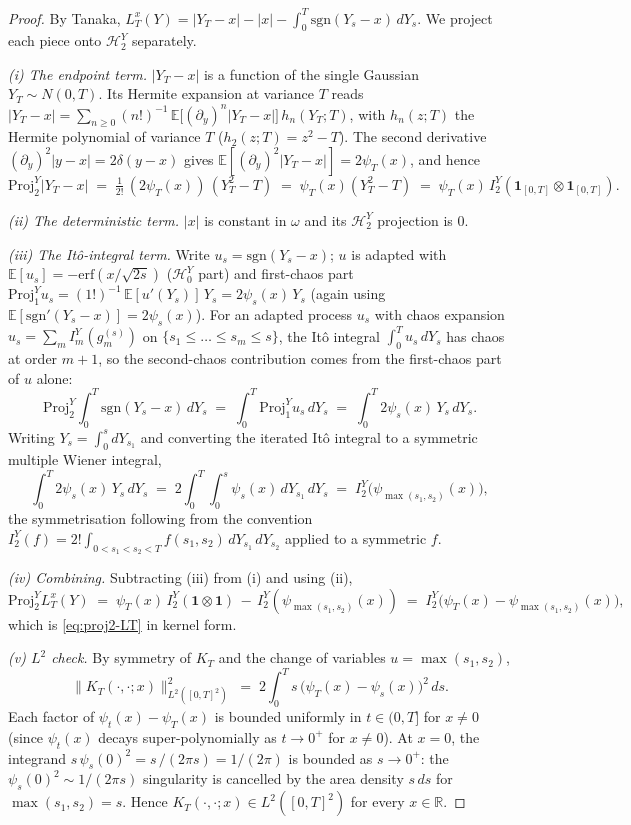 \documentclass[11pt,reqno]{amsart}
\theoremstyle{plain}
\theoremstyle{definition}
\theoremstyle{remark}
\newcommand{\R}{\mathbb{R}}
\newcommand{\E}{\mathbb{E}}
\newcommand{\Proj}{\mathrm{Proj}}
\newcommand{\HY}[1]{\mathcal{H}^{Y}_{#1}}
\newcommand{\Loc}{L}
\begin{document}
\begin{proof}
By Tanaka,
$\Loc_T^x(Y) = |Y_T - x| - |x| - \int_0^T \mathrm{sgn}(Y_s - x)\,dY_s$.
We project each piece onto $\HY{2}$ separately.

\emph{(i) The endpoint term.}
$|Y_T - x|$ is a function of the single Gaussian $Y_T \sim N(0, T)$.
Its Hermite expansion at variance $T$ reads
$|Y_T - x| = \sum_{n \ge 0} (n!)^{-1}\,
 \E\!\bigl[(\partial_y)^n |Y_T - x|\bigr]\, h_n(Y_T; T)$,
with $h_n(z; T)$ the Hermite polynomial of variance $T$
($h_2(z; T) = z^2 - T$). The second derivative
$(\partial_y)^2 |y - x| = 2 \delta(y - x)$ gives
$\E[(\partial_y)^2 |Y_T - x|] = 2 \psi_T(x)$, and hence
\[
  \Proj^Y_2 |Y_T - x|
   \;=\; \tfrac{1}{2!}\,(2 \psi_T(x))\,(Y_T^2 - T)
   \;=\; \psi_T(x)(Y_T^2 - T)
   \;=\; \psi_T(x)\,I_2^Y(\mathbf{1}_{[0,T]} \otimes \mathbf{1}_{[0,T]}).
\]

\emph{(ii) The deterministic term.} $|x|$ is constant in $\omega$ and
its $\HY{2}$ projection is $0$.

\emph{(iii) The It\^o-integral term.} Write $u_s = \mathrm{sgn}(Y_s - x)$;
$u$ is adapted with $\E[u_s] = -\mathrm{erf}(x/\sqrt{2s})$
($\HY{0}$ part) and first-chaos part
$\Proj^Y_1 u_s = (1!)^{-1}\,\E[u'(Y_s)]\,Y_s = 2 \psi_s(x)\,Y_s$
(again using $\E[\mathrm{sgn}'(Y_s - x)] = 2 \psi_s(x)$). For an
adapted process $u_s$ with chaos expansion
$u_s = \sum_m I_m^Y(g_m^{(s)})$ on $\{s_1 \le \dots \le s_m \le s\}$,
the It\^o integral $\int_0^T u_s\,dY_s$ has chaos at order $m+1$,
so the second-chaos contribution comes from the first-chaos part of
$u$ alone:
\[
  \Proj^Y_2 \int_0^T \mathrm{sgn}(Y_s - x)\,dY_s
   \;=\; \int_0^T \Proj^Y_1 u_s\,dY_s
   \;=\; \int_0^T 2 \psi_s(x)\,Y_s\,dY_s.
\]
Writing $Y_s = \int_0^s dY_{s_1}$ and converting the iterated It\^o
integral to a symmetric multiple Wiener integral,
\[
  \int_0^T 2 \psi_s(x)\,Y_s\,dY_s
   \;=\; 2 \int_0^T \!\int_0^s \psi_s(x)\,dY_{s_1}\,dY_s
   \;=\; I_2^Y\!\bigl(\psi_{\max(s_1, s_2)}(x)\bigr),
\]
the symmetrisation following from the convention
$I_2^Y(f) = 2! \int_{0 < s_1 < s_2 < T} f(s_1, s_2)\,dY_{s_1}\,dY_{s_2}$
applied to a symmetric $f$.

\emph{(iv) Combining.}
Subtracting (iii) from (i) and using (ii),
\[
  \Proj^Y_2 \Loc_T^x(Y)
   \;=\; \psi_T(x)\,I_2^Y(\mathbf{1} \otimes \mathbf{1})
        \,-\, I_2^Y(\psi_{\max(s_1, s_2)}(x))
   \;=\; I_2^Y\!\bigl(\psi_T(x) - \psi_{\max(s_1, s_2)}(x)\bigr),
\]
which is \eqref{eq:proj2-LT} in kernel form.

\emph{(v) $L^2$ check.}
By symmetry of $K_T$ and the change of variables $u = \max(s_1, s_2)$,
\[
  \|K_T(\cdot, \cdot; x)\|_{L^2([0,T]^2)}^2
   \;=\; 2 \int_0^T s\,\bigl(\psi_T(x) - \psi_s(x)\bigr)^2\,ds.
\]
Each factor of $\psi_t(x) - \psi_T(x)$ is bounded uniformly in
$t \in (0, T]$ for $x \ne 0$ (since $\psi_t(x)$ decays
super-polynomially as $t \to 0^+$ for $x \ne 0$). At $x = 0$, the
integrand $s\,\psi_s(0)^2 = s\,/(2\pi s) = 1/(2\pi)$ is bounded as
$s \to 0^+$: the $\psi_s(0)^2 \sim 1/(2\pi s)$ singularity is
cancelled by the area density $s\,ds$ for
$\max(s_1, s_2) = s$. Hence $K_T(\cdot, \cdot; x) \in L^2([0, T]^2)$
for every $x \in \R$.
\end{proof}
\end{document}
